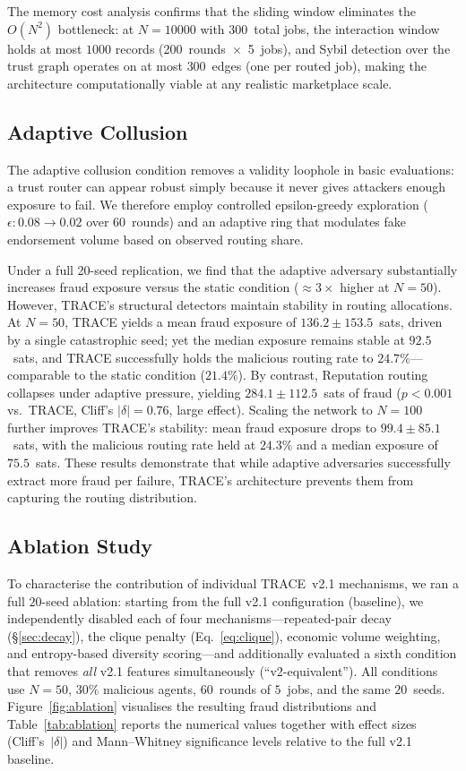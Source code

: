 \documentclass[sigconf,nonacm,10pt]{acmart}
\begin{document}
The memory cost analysis confirms that the sliding window eliminates
the $O(N^2)$ bottleneck: at $N{=}10000$ with 300~total jobs, the
interaction window holds at most $1000$ records (200~rounds~$\times$~5~jobs),
and Sybil detection over the trust graph operates on at most $300$~edges
(one per routed job), making the architecture computationally viable
at any realistic marketplace scale.

\subsection{Adaptive Collusion}
\label{sec:adaptive-eval}

The adaptive collusion condition removes a validity loophole in basic
evaluations: a trust router can appear robust simply because it never
gives attackers enough exposure to fail. We therefore employ controlled
epsilon-greedy exploration ($\epsilon:0.08\rightarrow0.02$ over
60~rounds) and an adaptive ring that modulates fake endorsement volume
based on observed routing share.

Under a full 20-seed replication, we find that the adaptive adversary
substantially increases fraud exposure versus the static condition
(${\approx}3\times$ higher at $N{=}50$). However, TRACE's structural
detectors maintain stability in routing allocations. At $N{=}50$,
TRACE yields a mean fraud exposure of $136.2 \pm 153.5$~sats, driven
by a single catastrophic seed; yet the median exposure remains stable
at $92.5$~sats, and TRACE successfully holds the malicious routing rate
to $24.7\%$---comparable to the static condition ($21.4\%$). By contrast,
Reputation routing collapses under adaptive pressure, yielding
$284.1 \pm 112.5$~sats of fraud ($p < 0.001$ vs.\ TRACE,
Cliff's $|\delta| = 0.76$, large effect). Scaling the
network to $N{=}100$ further improves TRACE's stability: mean fraud
exposure drops to $99.4 \pm 85.1$~sats, with the malicious routing rate
held at $24.3\%$ and a median exposure of $75.5$~sats. These results
demonstrate that while adaptive adversaries successfully extract more
fraud per failure, TRACE's architecture prevents them from capturing
the routing distribution.

\subsection{Ablation Study}
\label{sec:eval:ablation}

To characterise the contribution of individual TRACE~v2.1
mechanisms, we ran a full $20$-seed ablation: starting from the
full v2.1 configuration (baseline), we independently disabled
each of four mechanisms---repeated-pair decay
(\S\ref{sec:decay}), the clique penalty (Eq.~\ref{eq:clique}),
economic volume weighting, and entropy-based diversity
scoring---and additionally evaluated a sixth condition that
removes \emph{all} v2.1 features simultaneously
(``v2-equivalent''). All conditions use $N{=}50$, $30\%$
malicious agents, $60$~rounds of $5$~jobs, and the same
$20$~seeds. Figure~\ref{fig:ablation} visualises the resulting
fraud distributions and Table~\ref{tab:ablation} reports the
numerical values together with effect sizes
(Cliff's~$|\delta|$) and Mann--Whitney significance levels
relative to the full v2.1 baseline.
\end{document}
